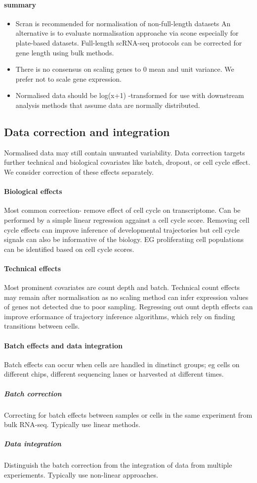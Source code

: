 \documentclass[a4paper,12pt]{article}
\begin{document}
\paragraph{summary}
\begin{itemize}
\item Scran is recommended for normalisation of non-full-length datasets An alternative is to evaluate normalisation approache via scone especially for plate-based datasets.  Full-length scRNA-seq protocols can be corrected for gene length using bulk methods.
\item There is no consensus on scaling genes to 0 mean and unit variance. We prefer not to scale gene expression.
\item Normalised data should be log(x+1) -transformed for use with downstream analysis methods that assume data are normally distributed.
\end{itemize}

\subsection{Data correction and integration}
Normalised data may still contain unwanted variability. Data correction targets further technical and biological covariates like batch, dropout, or cell cycle effect.
We consider correction of these effects separately.

\paragraph{Biological effects}
Most common correction- remove effect of cell cycle on transcriptome.  Can be performed by a simple linear regression aggainst a cell cycle score.
Removing cell cycle effects can improve inference of developmental trajectories but cell cycle signals can also be informative of the biology. EG proliferating cell populations can be identified based on cell cycle scores.
\paragraph{Technical effects}
Most prominent covariates are count depth and batch.
Technical count effects may remain after normalisation as no scaling method can infer expression values of genes not detected due to poor sampling. 
Regressing out ount depth effects can improve erformance of trajectory inference algorithms, which rely on finding transitions between cells.

\paragraph{Batch effects and data integration}
Batch effects can occur when cells are handled in dinstinct groups; eg cells on different chips, different sequencing lanes or harvested at different times.
\subparagraph{Batch correction}
Correcting for batch effects between samples or cells in the same experiment from bulk RNA-seq. Typically use linear methods.
\subparagraph{Data integration}
Distinguish the batch correction from the integration of data from multiple experiements. Typically use non-linear approaches.
\end{document}
